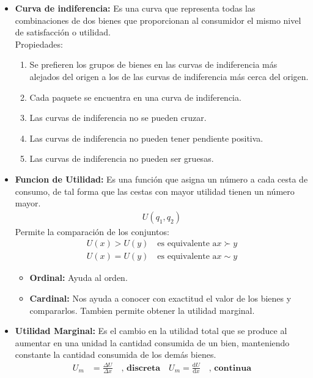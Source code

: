 \documentclass{templateNote}
\begin{document}
\begin{itemize}
\begin{enumerate}
    \end{enumerate}

    \item \textbf{Curva de indiferencia:} Es una curva que representa todas las combinaciones de dos bienes que proporcionan al consumidor el mismo nivel de satisfacción o utilidad.\\
    Propiedades:
    \begin{enumerate}
        \item Se prefieren los grupos de bienes en las curvas de indiferencia más
        alejados del origen a los de las curvas de indiferencia más cerca del
        origen.
        
        \item Cada paquete se encuentra en una curva de indiferencia.
        
        \item Las curvas de indiferencia no se pueden cruzar.

        \item Las curvas de indiferencia no pueden tener pendiente positiva.
        
        \item Las curvas de indiferencia no pueden ser gruesas.
    \end{enumerate}

    \item \textbf{Funcion de Utilidad:} Es una función que asigna un número a cada cesta de consumo, de tal forma que las cestas con mayor utilidad tienen un número mayor.
    \begin{align*}
        U(q_1,q_2) 
    \end{align*}
    Permite la comparación de los conjuntos:    
    \begin{align*}
        U(x) > U(y) \quad \text{es equivalente a} x \succ y \\
        U(x) = U(y) \quad \text{es equivalente a} x \sim y
    \end{align*}
    
    \begin{itemize}
        \item \textbf{Ordinal:} Ayuda al orden.
        \item \textbf{Cardinal:} Nos ayuda a conocer con exactitud el valor de los bienes y compararlos. Tambien permite obtener la utilidad marginal.
    \end{itemize}
    \item \textbf{Utilidad Marginal:} Es el cambio en la utilidad total que se produce al aumentar en una unidad la cantidad consumida de un bien, manteniendo constante la cantidad consumida de los demás bienes.
    \begin{align*}
        U_m &= \frac{\Delta U}{\Delta x} \quad \textbf{, discreta} \quad U_m = \frac{\mathrm{d} U}{\mathrm{d}x} \quad \textbf{, continua}
    \end{align*}


\end{itemize}
\end{document}
